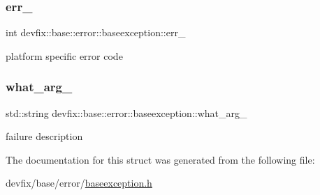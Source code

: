 \subsubsection{\texorpdfstring{err\+\_\+}{err\_}}
{\footnotesize\ttfamily int devfix\+::base\+::error\+::baseexception\+::err\+\_\+\hspace{0.3cm}{\ttfamily [protected]}}



platform specific error code 

\mbox{\label{structdevfix_1_1base_1_1error_1_1baseexception_adec18389f27e1d1dae67f80caa1b617b}} 
\subsubsection{\texorpdfstring{what\+\_\+arg\+\_\+}{what\_arg\_}}
{\footnotesize\ttfamily std\+::string devfix\+::base\+::error\+::baseexception\+::what\+\_\+arg\+\_\+\hspace{0.3cm}{\ttfamily [protected]}}



failure description 



The documentation for this struct was generated from the following file\+:\begin{DoxyCompactItemize}
\item 
devfix/base/error/\hyperlink{baseexception_8h}{baseexception.\+h}\end{DoxyCompactItemize}
